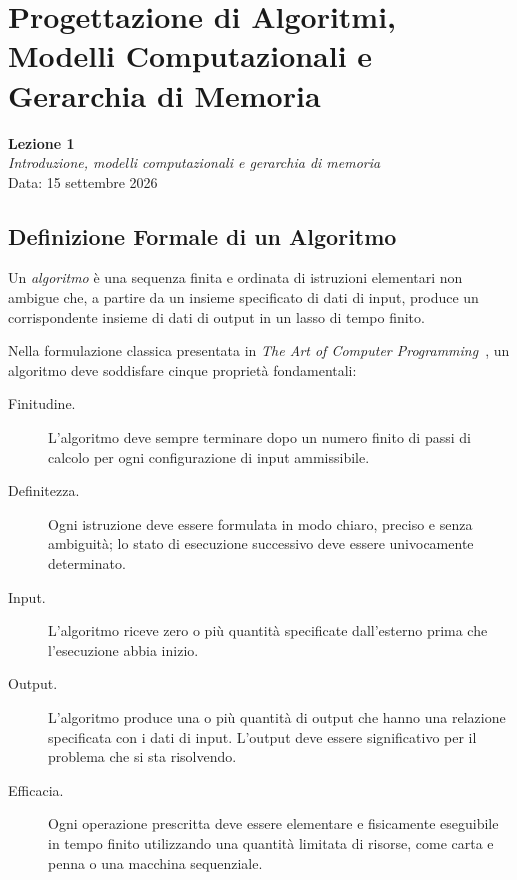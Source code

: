 \chapter{Progettazione di Algoritmi, Modelli Computazionali e Gerarchia di Memoria}
\label{cha:lecture-one}

\begin{center}
  \textbf{Lezione 1}\\
  \emph{Introduzione, modelli computazionali e gerarchia di memoria}\\[0.5em]
  Data: 15 settembre 2026
\end{center}

\section{Definizione Formale di un Algoritmo}
\label{sec:formal-algorithm}

Un \emph{algoritmo} è una sequenza finita e ordinata di istruzioni elementari non ambigue che, a partire da un insieme specificato di dati di input, produce un corrispondente insieme di dati di output in un lasso di tempo finito.

Nella formulazione classica presentata in \emph{The Art of Computer Programming}~\cite{knuth1997}, un algoritmo deve soddisfare cinque proprietà fondamentali:

\begin{description}
  \item[Finitudine.] L'algoritmo deve sempre terminare dopo un numero finito di passi di calcolo per ogni configurazione di input ammissibile.
  \item[Definitezza.] Ogni istruzione deve essere formulata in modo chiaro, preciso e senza ambiguità; lo stato di esecuzione successivo deve essere univocamente determinato.
  \item[Input.] L'algoritmo riceve zero o più quantità specificate dall'esterno prima che l'esecuzione abbia inizio.
  \item[Output.] L'algoritmo produce una o più quantità di output che hanno una relazione specificata con i dati di input. L'output deve essere significativo per il problema che si sta risolvendo.
  \item[Efficacia.] Ogni operazione prescritta deve essere elementare e fisicamente eseguibile in tempo finito utilizzando una quantità limitata di risorse, come carta e penna o una macchina sequenziale.
\end{description}


